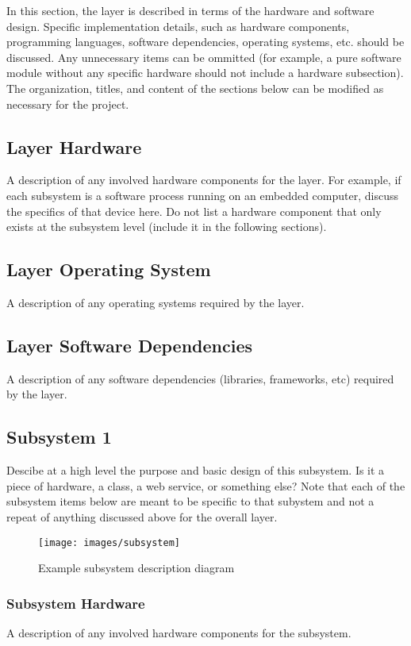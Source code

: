 In this section, the layer is described in terms of the hardware and software design. Specific implementation details, such as hardware components, programming languages, software dependencies, operating systems, etc. should be discussed. Any unnecessary items can be ommitted (for example, a pure software module without any specific hardware should not include a hardware subsection). The organization, titles, and content of the sections below can be modified as necessary for the project.

\subsection{Layer Hardware}
A description of any involved hardware components for the layer. For example, if each subsystem is a software process running on an embedded computer, discuss the specifics of that device here. Do not list a hardware component that only exists at the subsystem level (include it in the following sections).

\subsection{Layer Operating System}
A description of any operating systems required by the layer.

\subsection{Layer Software Dependencies}
A description of any software dependencies (libraries, frameworks, etc) required by the layer.

\subsection{Subsystem 1}
Descibe at a high level the purpose and basic design of this subsystem. Is it a piece of hardware, a class, a web service, or something else? Note that each of the subsystem items below are meant to be specific to that subystem and not a repeat of anything discussed above for the overall layer.

\begin{figure}[h!]
	\centering
 	\texttt{[image: images/subsystem]}
 \caption{Example subsystem description diagram}
\end{figure}

\subsubsection{Subsystem Hardware}
A description of any involved hardware components for the subsystem.

